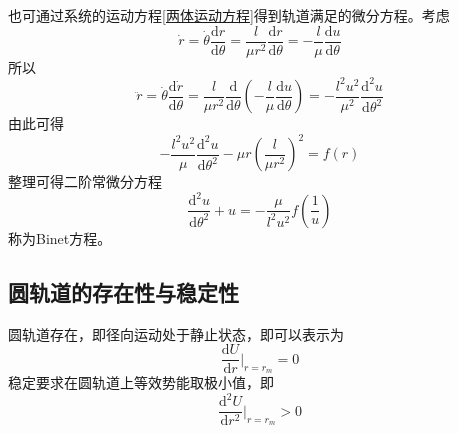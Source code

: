 也可通过系统的运动方程\eqref{两体运动方程}得到轨道满足的微分方程。考虑
\begin{equation*}
	\dot{r} = \dot{\theta} \frac{\mathrm{d} r}{\mathrm{d} \theta} = \frac{l}{\mu r^2} \frac{\mathrm{d} r}{\mathrm{d} \theta} = -\frac{l}{\mu} \frac{\mathrm{d} u}{\mathrm{d} \theta}
\end{equation*}
所以
\begin{equation*}
	\ddot{r} = \dot{\theta} \frac{\mathrm{d} \dot{r}}{\mathrm{d} \theta} = \frac{l}{\mu r^2} \frac{\mathrm{d}}{\mathrm{d} \theta} \left(-\frac{l}{\mu} \frac{\mathrm{d} u}{\mathrm{d} \theta}\right) = -\frac{l^2u^2}{\mu^2} \frac{\mathrm{d}^2 u}{\mathrm{d} \theta^2}
\end{equation*}
由此可得
\begin{equation*}
	-\frac{l^2u^2}{\mu} \frac{\mathrm{d}^2 u}{\mathrm{d} \theta^2} - \mu r\left(\frac{l}{\mu r^2}\right)^2 = f(r)
\end{equation*}
整理可得二阶常微分方程
\begin{equation}
	\frac{\mathrm{d}^2 u}{\mathrm{d} \theta^2} + u = -\frac{\mu}{l^2 u^2} f\left(\frac{1}{u}\right)
	\label{Binet方程}
\end{equation}
称为{\heiti Binet方程}。

\subsection{圆轨道的存在性与稳定性}

圆轨道存在，即径向运动处于静止状态，即可以表示为
\begin{equation*}
	\frac{\mathrm{d} U}{\mathrm{d} r} \bigg|_{r=r_m} = 0
\end{equation*}
稳定要求在圆轨道上等效势能取极小值，即
\begin{equation*}
	\frac{\mathrm{d}^2 U}{\mathrm{d} r^2} \bigg|_{r=r_m} > 0
\end{equation*}

